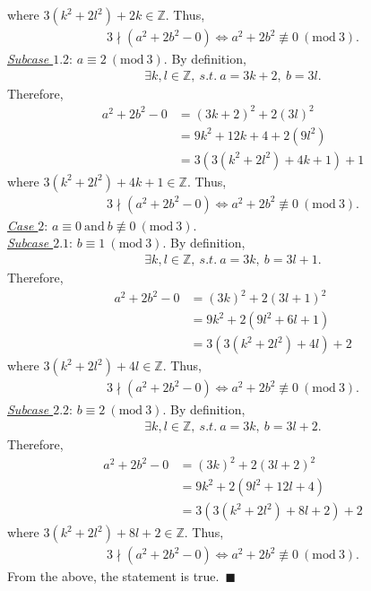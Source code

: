 \documentclass[12pt]{article}
\begin{document}
where $3(k^2+2l^2) + 2k \in \mathbb{Z}$. Thus,
\begin{gather*}
3 \nmid (a^2 + 2 b^2 - 0) \Leftrightarrow a^2 + 2 b^2 \not \equiv 0~(\mathrm{mod}~3).
\end{gather*}
\underline{\textit{Subcase $1.2$}}: $a \equiv 2~(\mathrm{mod}~3)$.
By definition,
\begin{gather*}
\exists k, l \in \mathbb{Z},~s.t.~ a = 3k + 2,~b = 3l.
\end{gather*}
Therefore,
\begin{align*}
a^2 + 2 b^2 - 0 &= (3k + 2)^2 + 2 (3l)^2\\[1em]
&= 9k^2 + 12k + 4 + 2(9l^2)\\[1em]
&= 3(3(k^2+2l^2) + 4k + 1) + 1
\end{align*}
where $3(k^2+2l^2) + 4k + 1 \in \mathbb{Z}$. Thus,
\begin{gather*}
3 \nmid (a^2 + 2 b^2 - 0) \Leftrightarrow a^2 + 2 b^2 \not \equiv 0~(\mathrm{mod}~3).
\end{gather*}
\underline{\textit{Case $2$}}: $a \equiv 0~\mathrm{and}~b \not \equiv 0~(\mathrm{mod}~3)$.\\[1em]
\underline{\textit{Subcase $2.1$}}: $b \equiv 1~(\mathrm{mod}~3)$.
By definition,
\begin{gather*}
\exists k, l \in \mathbb{Z},~s.t.~ a = 3k,~b = 3l + 1.
\end{gather*}
Therefore,
\begin{align*}
a^2 + 2 b^2 - 0 &= (3k)^2 + 2 (3l + 1)^2\\[1em]
&= 9k^2 + 2(9l^2 + 6l + 1)\\[1em]
&= 3(3(k^2+2l^2) + 4l) + 2
\end{align*}
where $3(k^2+2l^2) + 4l \in \mathbb{Z}$. Thus,
\begin{gather*}
3 \nmid (a^2 + 2 b^2 - 0) \Leftrightarrow a^2 + 2 b^2 \not \equiv 0~(\mathrm{mod}~3).
\end{gather*}
\underline{\textit{Subcase $2.2$}}: $b \equiv 2~(\mathrm{mod}~3)$.
By definition,
\begin{gather*}
\exists k, l \in \mathbb{Z},~s.t.~ a = 3k,~b = 3l + 2.
\end{gather*}
Therefore,
\begin{align*}
a^2 + 2 b^2 - 0 &= (3k)^2 + 2 (3l + 2)^2\\[1em]
&= 9k^2 + 2(9l^2 + 12l + 4)\\[1em]
&= 3(3(k^2+2l^2) + 8l + 2) + 2
\end{align*}
where $3(k^2+2l^2) + 8l + 2 \in \mathbb{Z}$. Thus,
\begin{gather*}
3 \nmid (a^2 + 2 b^2 - 0) \Leftrightarrow a^2 + 2 b^2 \not \equiv 0~(\mathrm{mod}~3).
\end{gather*}
From the above, the statement is true.~$\blacksquare$
\end{document}
